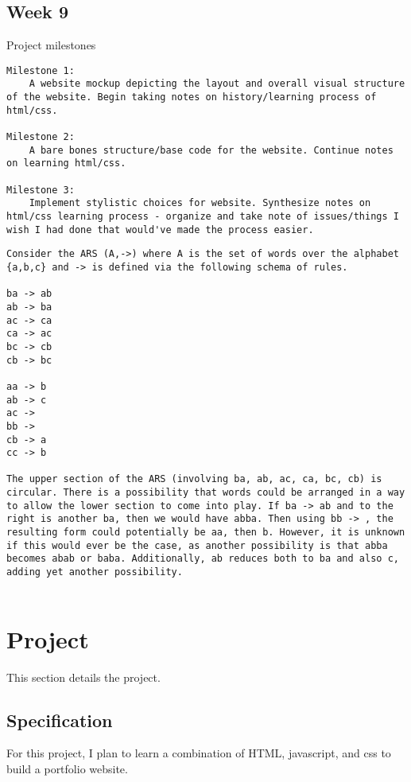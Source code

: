 \documentclass{article}
\theoremstyle{theorem}
\theoremstyle{definition}
\theoremstyle{remark}
\begin{document}
\subsection{Week 9}
Project milestones
\begin{lstlisting}
Milestone 1:
    A website mockup depicting the layout and overall visual structure of the website. Begin taking notes on history/learning process of html/css.

Milestone 2:
    A bare bones structure/base code for the website. Continue notes on learning html/css.

Milestone 3:
    Implement stylistic choices for website. Synthesize notes on html/css learning process - organize and take note of issues/things I wish I had done that would've made the process easier.

\end{lstlisting}


\begin{lstlisting}
Consider the ARS (A,->) where A is the set of words over the alphabet {a,b,c} and -> is defined via the following schema of rules.

ba -> ab
ab -> ba
ac -> ca
ca -> ac
bc -> cb
cb -> bc
 
aa -> b
ab -> c
ac ->  
bb -> 
cb -> a
cc -> b

The upper section of the ARS (involving ba, ab, ac, ca, bc, cb) is circular. There is a possibility that words could be arranged in a way to allow the lower section to come into play. If ba -> ab and to the right is another ba, then we would have abba. Then using bb -> , the resulting form could potentially be aa, then b. However, it is unknown if this would ever be the case, as another possibility is that abba becomes abab or baba. Additionally, ab reduces both to ba and also c, adding yet another possibility. 


\end{lstlisting}


\section{Project}

This section details the project.

\subsection{Specification}
For this project, I plan to learn a combination of HTML, javascript, and css to build a portfolio website. 
\end{document}
